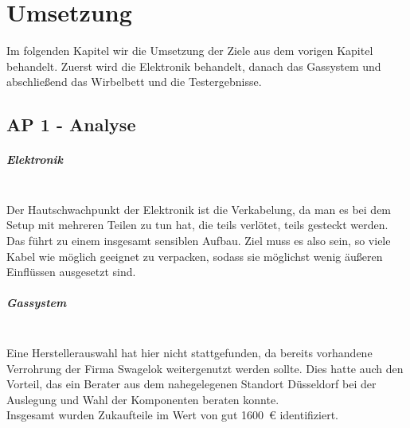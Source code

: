 \chapter{Umsetzung}

Im folgenden Kapitel wir die Umsetzung der Ziele aus dem vorigen Kapitel behandelt. Zuerst wird die Elektronik behandelt, danach das Gassystem und abschließend das Wirbelbett und die Testergebnisse.


\section{AP 1 - Analyse}

\paragraph{Elektronik}
\hfill \\
Der Hautschwachpunkt der Elektronik ist die Verkabelung, da man es bei dem Setup mit mehreren Teilen zu tun hat, die teils verlötet, teils gesteckt werden. Das führt zu einem insgesamt sensiblen Aufbau. Ziel muss es also sein, so viele Kabel wie möglich geeignet zu verpacken, sodass sie möglichst wenig äußeren Einflüssen ausgesetzt sind. 


\paragraph{Gassystem}
\hfill \\
Eine Herstellerauswahl hat hier nicht stattgefunden, da bereits vorhandene Verrohrung der Firma Swagelok weitergenutzt werden sollte. Dies hatte auch den Vorteil, das ein Berater aus dem nahegelegenen Standort Düsseldorf bei der Auslegung und Wahl der Komponenten beraten konnte. \\
Insgesamt wurden Zukaufteile im Wert von gut \SI{1600}{\euro} identifiziert. 

